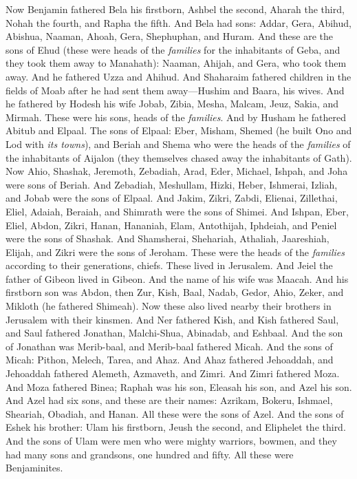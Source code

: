 \begin{biblechapter} %
 Now Benjamin fathered Bela his firstborn, Ashbel the second, Aharah the third,
\verse Nohah the fourth, and Rapha the fifth.
\verse And Bela had sons: Addar, Gera, Abihud,
\verse Abishua, Naaman, Ahoah,
\verse Gera, Shephuphan, and Huram.
\verse And these are the sons of Ehud (these were heads of the \textit{families} for the inhabitants of Geba, and they took them away to Manahath):
\verse Naaman, Ahijah, and Gera, who took them away. And he fathered Uzza and Ahihud.
\verse And Shaharaim fathered children in the fields of Moab after he had sent them away—Hushim and Baara, his wives.
\verse And he fathered by Hodesh his wife Jobab, Zibia, Mesha, Malcam,
\verse Jeuz, Sakia, and Mirmah. These were his sons, heads of the \textit{families}.
\verse And by Husham he fathered Abitub and Elpaal.
\verse The sons of Elpaal: Eber, Misham, Shemed (he built Ono and Lod with \textit{its towns}),
\verse and Beriah and Shema who were the heads of the \textit{families} of the inhabitants of Aijalon (they themselves chased away the inhabitants of Gath).
\verse Now Ahio, Shashak, Jeremoth,
\verse Zebadiah, Arad, Eder,
\verse Michael, Ishpah, and Joha were sons of Beriah.
\verse And Zebadiah, Meshullam, Hizki, Heber,
\verse Ishmerai, Izliah, and Jobab were the sons of Elpaal.
\verse And Jakim, Zikri, Zabdi,
\verse Elienai, Zillethai, Eliel,
\verse Adaiah, Beraiah, and Shimrath were the sons of Shimei.
\verse And Ishpan, Eber, Eliel,
\verse Abdon, Zikri, Hanan,
\verse Hananiah, Elam, Antothijah,
\verse Iphdeiah, and Peniel were the sons of Shashak.
\verse And Shamsherai, Shehariah, Athaliah,
\verse Jaareshiah, Elijah, and Zikri were the sons of Jeroham.
\verse These were the heads of the \textit{families} according to their generations, chiefs. These lived in Jerusalem.
\verse And Jeiel the father of Gibeon lived in Gibeon. And the name of his wife was Maacah.
\verse And his firstborn son was Abdon, then Zur, Kish, Baal, Nadab,
\verse Gedor, Ahio, Zeker,
\verse and Mikloth (he fathered Shimeah). Now these also lived nearby their brothers in Jerusalem with their kinsmen.
\verse And Ner fathered Kish, and Kish fathered Saul, and Saul fathered Jonathan, Malchi-Shua, Abinadab, and Eshbaal.
\verse And the son of Jonathan was Merib-baal, and Merib-baal fathered Micah.
\verse And the sons of Micah: Pithon, Melech, Tarea, and Ahaz.
\verse And Ahaz fathered Jehoaddah, and Jehoaddah fathered Alemeth, Azmaveth, and Zimri. And Zimri fathered Moza.
\verse And Moza fathered Binea; Raphah was his son, Eleasah his son, and Azel his son.
\verse And Azel had six sons, and these are their names: Azrikam, Bokeru, Ishmael, Sheariah, Obadiah, and Hanan. All these were the sons of Azel.
\verse And the sons of Eshek his brother: Ulam his firstborn, Jeush the second, and Eliphelet the third.
\verse And the sons of Ulam were men who were mighty warriors, bowmen, and they had many sons and grandsons, one hundred and fifty. All these were Benjaminites.
\end{biblechapter}

